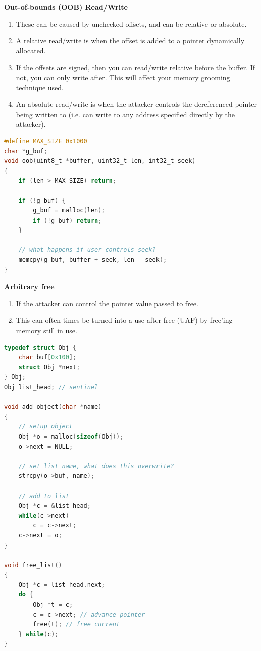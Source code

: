 \documentclass[12pt]{Training}
\begin{document}
\textbf{Out-of-bounds (OOB) Read/Write}
\begin{enumerate}
    \item These can be caused by unchecked offsets, and can be relative or absolute.
    \item A relative read/write is when the offset is added to a pointer dynamically allocated.
   \item  If the offsets are signed, then you can read/write relative before the buffer. If not, you can only write after. This will affect your memory grooming technique used.
    \item An absolute read/write is when the attacker controls the dereferenced pointer being written to (i.e. can write to any address specified directly by the attacker).
\end{enumerate}
\begin{sectionbox}
\begin{lstlisting}[language=C, caption={Out-of-bound Read}]
#define MAX_SIZE 0x1000
char *g_buf;
void oob(uint8_t *buffer, uint32_t len, int32_t seek)
{
    if (len > MAX_SIZE) return;

    if (!g_buf) {
        g_buf = malloc(len);
        if (!g_buf) return;
    }

    // what happens if user controls seek?
    memcpy(g_buf, buffer + seek, len - seek);
}
\end{lstlisting}
\end{sectionbox}

\textbf{Arbitrary free}
\begin{enumerate}
    \item If the attacker can control the pointer value passed to free.
    \item This can often times be turned into a use-after-free (UAF) by free'ing memory still in use.
\end{enumerate}
\begin{sectionbox}
\begin{lstlisting}[language=C, caption={Arbitrary Free}]
typedef struct Obj {
    char buf[0x100];
    struct Obj *next;
} Obj;
Obj list_head; // sentinel

void add_object(char *name)
{
    // setup object
    Obj *o = malloc(sizeof(Obj));
    o->next = NULL;

    // set list name, what does this overwrite?
    strcpy(o->buf, name);

    // add to list
    Obj *c = &list_head;
    while(c->next)
        c = c->next;
    c->next = o;
}

void free_list()
{
    Obj *c = list_head.next;
    do {
        Obj *t = c;
        c = c->next; // advance pointer
        free(t); // free current
    } while(c);
}
\end{lstlisting}
\end{sectionbox}
\end{document}
